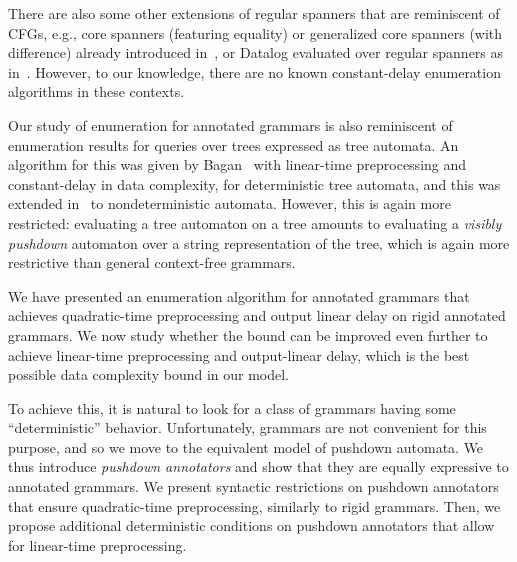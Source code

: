 There are also some other extensions of regular spanners that are reminiscent of CFGs, e.g., core spanners (featuring equality) or generalized core spanners (with difference) already introduced in~\cite{FaginKRV15}, or Datalog evaluated over regular spanners as in~\cite{peterfreund2019recursive}. However, to our knowledge, there are no known constant-delay enumeration algorithms in these contexts.

Our study of enumeration for annotated grammars is also reminiscent of
enumeration results for queries over trees expressed as tree automata. An
algorithm for this was given by Bagan~\cite{bagan2006mso} with linear-time
preprocessing and constant-delay in data complexity, for deterministic tree
automata, and this was extended in~\cite{amarilli2019enumeration} to
nondeterministic automata. However, this is again more restricted:
evaluating a tree automaton on a tree amounts to evaluating a \emph{visibly
pushdown} automaton over a string representation of the tree, which is again
more restrictive than general context-free grammars.

%


%
%

We have presented an enumeration algorithm for annotated grammars that achieves
quadratic-time preprocessing and output linear delay on rigid annotated
grammars. We now study whether the bound can be improved even further to achieve
linear-time preprocessing and output-linear delay, which is the best possible
data complexity bound in our model.

To achieve this, it is natural to look for a class of grammars having some ``deterministic'' behavior.
Unfortunately, grammars are not convenient for this purpose, and so we move to
the equivalent model of pushdown automata.
We thus introduce \emph{pushdown annotators} and show that they are equally expressive to annotated grammars.
We present syntactic restrictions on pushdown annotators that ensure
quadratic-time preprocessing, similarly to rigid grammars.
%
Then, we propose additional deterministic conditions on pushdown annotators that allow for linear-time preprocessing.
%

